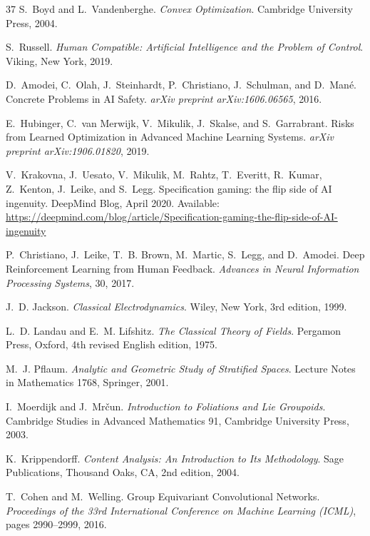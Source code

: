 \documentclass[12pt]{article}
\begin{document}
\begin{thebibliography}{37}
S.~Boyd and L.~Vandenberghe.
\newblock \emph{Convex Optimization}.
\newblock Cambridge University Press, 2004.

S.~Russell.
\newblock \emph{Human Compatible: Artificial Intelligence and the Problem of Control}.
\newblock Viking, New York, 2019.

D.~Amodei, C.~Olah, J.~Steinhardt, P.~Christiano, J.~Schulman, and D.~Man\'{e}.
\newblock Concrete Problems in AI Safety.
\newblock \emph{arXiv preprint arXiv:1606.06565}, 2016.

E.~Hubinger, C.~van Merwijk, V.~Mikulik, J.~Skalse, and S.~Garrabrant.
\newblock Risks from Learned Optimization in Advanced Machine Learning Systems.
\newblock \emph{arXiv preprint arXiv:1906.01820}, 2019.

V.~Krakovna, J.~Uesato, V.~Mikulik, M.~Rahtz, T.~Everitt, R.~Kumar, Z.~Kenton, J.~Leike, and S.~Legg.
\newblock Specification gaming: the flip side of AI ingenuity.
\newblock DeepMind Blog, April 2020.
\newblock Available: \url{https://deepmind.com/blog/article/Specification-gaming-the-flip-side-of-AI-ingenuity}

P.~Christiano, J.~Leike, T.~B. Brown, M.~Martic, S.~Legg, and D.~Amodei.
\newblock Deep Reinforcement Learning from Human Feedback.
\newblock \emph{Advances in Neural Information Processing Systems}, 30, 2017.

J.~D. Jackson.
\newblock \emph{Classical Electrodynamics}.
\newblock Wiley, New York, 3rd edition, 1999.

L.~D. Landau and E.~M. Lifshitz.
\newblock \emph{The Classical Theory of Fields}.
\newblock Pergamon Press, Oxford, 4th revised English edition, 1975.

M.~J. Pflaum.
\newblock \emph{Analytic and Geometric Study of Stratified Spaces}.
\newblock Lecture Notes in Mathematics 1768, Springer, 2001.

I.~Moerdijk and J.~Mr\v{c}un.
\newblock \emph{Introduction to Foliations and Lie Groupoids}.
\newblock Cambridge Studies in Advanced Mathematics 91, Cambridge University Press, 2003.

K.~Krippendorff.
\newblock \emph{Content Analysis: An Introduction to Its Methodology}.
\newblock Sage Publications, Thousand Oaks, CA, 2nd edition, 2004.

T.~Cohen and M.~Welling.
\newblock Group Equivariant Convolutional Networks.
\newblock \emph{Proceedings of the 33rd International Conference on Machine Learning (ICML)}, pages 2990--2999, 2016.


\end{thebibliography}
\end{document}
